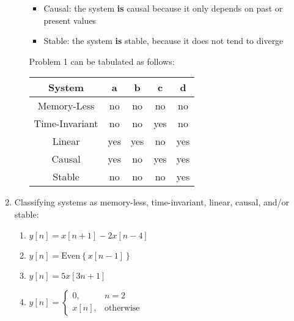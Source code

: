 \begin{enumerate}
\begin{enumerate}
\begin{itemize}
            \item Causal: the system \textbf{is} causal because it only depends on past or present values

            \item Stable: the system \textbf{is} stable, because it does not tend to diverge

        \end{itemize}

        Problem 1 can be tabulated as follows:

        \begin{center}
          \begin{tabular}[H]{|c|c|c|c|c|}
            \hline
            System & a & b & c & d\\
            \hline
            Memory-Less & no & no & no & no\\
            \hline
            Time-Invariant & no & no & yes & no\\
            \hline
            Linear & yes & yes & no & yes\\
            \hline
            Causal & yes & no & yes & yes\\
            \hline
            Stable & no & no & no & yes\\
            \hline
          \end{tabular}
        \end{center}

    \end{enumerate}

  \item Classifying systems as memory-less, time-invariant, linear, causal, and/or stable:

    \begin{enumerate}

      \item $y[n]=x[n+1]-2x[n-4]$

      \item $y[n]=\text{Even}\left\{ x[n-1] \right\}$

      \item $y[n]=5x[3n+1]$

      \item $y[n]=\left\{ \begin{array}{ll} 0, & n=2\\ x[n], & \text{otherwise}\end{array}$

    \end{enumerate}


\end{enumerate}
